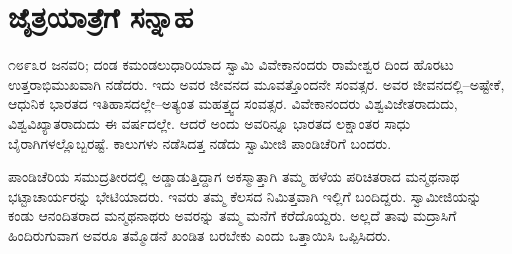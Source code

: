 
\chapter{ಜೈತ್ರಯಾತ್ರೆಗೆ ಸನ್ನಾಹ}

\noindent

೧೮೯೩ರ ಜನವರಿ; ದಂಡ ಕಮಂಡಲುಧಾರಿಯಾದ ಸ್ವಾಮಿ ವಿವೇಕಾನಂದರು ರಾಮೇಶ್ವರ ದಿಂದ ಹೊರಟು ಉತ್ತರಾಭಿಮುಖವಾಗಿ ನಡೆದರು. ಇದು ಅವರ ಜೀವನದ ಮೂವತ್ತೊಂದನೇ ಸಂವತ್ಸರ. ಅವರ ಜೀವನದಲ್ಲಿ–ಅಷ್ಟೇಕೆ, ಆಧುನಿಕ ಭಾರತದ ಇತಿಹಾಸದಲ್ಲೇ–ಅತ್ಯಂತ ಮಹತ್ತ್ವದ ಸಂವತ್ಸರ. ವಿವೇಕಾನಂದರು ವಿಶ್ವವಿಜೇತರಾದುದು, ವಿಶ್ವವಿಖ್ಯಾತರಾದುದು ಈ ವರ್ಷದಲ್ಲೇ. ಆದರೆ ಅಂದು ಅವರಿನ್ನೂ ಭಾರತದ ಲಕ್ಷಾಂತರ ಸಾಧು ಬೈರಾಗಿಗಳಲ್ಲೊಬ್ಬರಷ್ಟೆ. ಕಾಲುಗಳು ನಡೆಸಿದತ್ತ ನಡೆದು ಸ್ವಾಮೀಜಿ ಪಾಂಡಿಚೆರಿಗೆ ಬಂದರು.

ಪಾಂಡಿಚೆರಿಯ ಸಮುದ್ರತೀರದಲ್ಲಿ ಅಡ್ಡಾಡುತ್ತಿದ್ದಾಗ ಅಕಸ್ಮಾತ್ತಾಗಿ ತಮ್ಮ ಹಳೆಯ ಪರಿಚಿತರಾದ ಮನ್ಮಥನಾಥ ಭಟ್ಟಾಚಾರ್ಯರನ್ನು ಭೇಟಿಯಾದರು. ಇವರು ತಮ್ಮ ಕೆಲಸದ ನಿಮಿತ್ತವಾಗಿ ಇಲ್ಲಿಗೆ ಬಂದಿದ್ದರು. ಸ್ವಾಮೀಜಿಯನ್ನು ಕಂಡು ಆನಂದಿತರಾದ ಮನ್ಮಥನಾಥರು ಅವರನ್ನು ತಮ್ಮ ಮನೆಗೆ ಕರೆದೊಯ್ದರು. ಅಲ್ಲದೆ ತಾವು ಮದ್ರಾಸಿಗೆ ಹಿಂದಿರುಗುವಾಗ ಅವರೂ ತಮ್ಮೊಡನೆ ಖಂಡಿತ ಬರಬೇಕು ಎಂದು ಒತ್ತಾಯಿಸಿ ಒಪ್ಪಿಸಿದರು.

